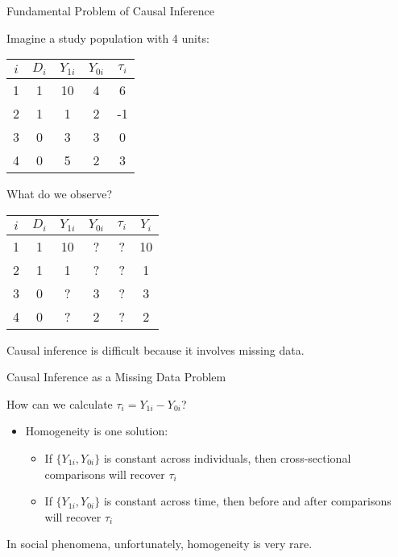 \documentclass{beamer}
\numberwithin{equation}{section}
\begin{document}
\begin{frame}{Fundamental Problem of Causal Inference}
\scriptsize

Imagine a study population with 4 units:

\begin{table}[ht]
    \centering
    \begin{tabular}{c   c  c c c }
      $i$ & $D_i$ & $Y_{1i}$ & $Y_{0i}$ & $\tau_i$ \\ \hline
      1  & 1 & 10  & 4 & 6 \\
      2  & 1 & 1  & 2 & -1 \\
      3 & 0 & 3 & 3 & 0 \\
      4 & 0 & 5 & 2 & 3 \\
    \end{tabular}
    \end{table}
    
 What do we observe?   \pause
    
\begin{table}[ht]
    \centering
    \begin{tabular}{c  c c c c c}
      $i$ & $D_i$ & $Y_{1i}$ & $Y_{0i}$ & $\tau_i$ & $Y_i$ \\ \hline
      1  & 1 & 10  & \alert{?}  & \alert{?} & 10 \\
      2  & 1 & 1  & \alert{?}  & \alert{?}  & 1 \\
      3 & 0 & \alert{?}  & 3 & \alert{?}  & 3  \\
      4 & 0 & \alert{?}  & 2 & \alert{?}  & 2 \\
    \end{tabular}
    \end{table}

Causal inference is difficult because it involves
missing data.

\end{frame}






\begin{frame}{Causal Inference as a Missing Data Problem}

How can we calculate $\tau_i = Y_{1i} - Y_{0i}$?\medskip

\begin{itemize}
\itemsep1pt\parskip0pt
\item
  Homogeneity is one solution:\medskip

  \begin{itemize}
  \itemsep1pt\parskip0pt
  \item
    If $\{Y_{1i}, Y_{0i}\}$ is constant across individuals, then
    cross-sectional comparisons will recover $\tau_i$\medskip
  \item
    If $\{Y_{1i}, Y_{0i}\}$ is constant across time, then before and
    after comparisons will recover $\tau_i$\medskip
  \end{itemize}
\end{itemize}

\pause

In social phenomena, unfortunately, homogeneity is very rare.

\end{frame}
\end{document}

